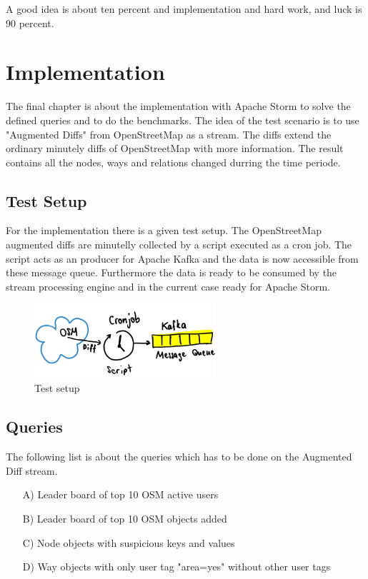 \begin{savequote}[75mm]
A good idea is about ten percent and implementation and hard work, and luck is 90 percent.
\end{savequote}

\chapter{Implementation}
The final chapter is about the implementation with Apache Storm to solve the defined queries and to do the benchmarks.
The idea of the test scenario is to use "Augmented Diffs" from OpenStreetMap as a stream.
The diffs extend the ordinary minutely diffs of OpenStreetMap with more information.
The result contains all the nodes, ways and relations changed durring the time periode.

\newpage

\section{Test Setup}
For the implementation there is a given test setup.
The OpenStreetMap augmented diffs are minutelly collected by a script executed as a cron job.
The script acts as an producer for Apache Kafka and the data is now accessible from these message queue.
Furthermore the data is ready to be consumed by the stream processing engine and in the current case ready for Apache Storm.

\begin{figure}[H]
\centering
\captionsetup{justification=centering}
\includegraphics[width=0.6\textwidth]{images/test_setup.png}
\caption[Test setup]{Test setup}
\end{figure}


\section{Queries}
The following list is about the queries which has to be done on the Augmented Diff stream.

\begin{itemize}
\item[A)] Leader board of top 10 OSM active users
\item[B)] Leader board of top 10 OSM objects added
\item[C)] Node objects with suspicious keys and values
\item[D)] Way objects with only user tag "area=yes" without other user tags
\end{itemize}

